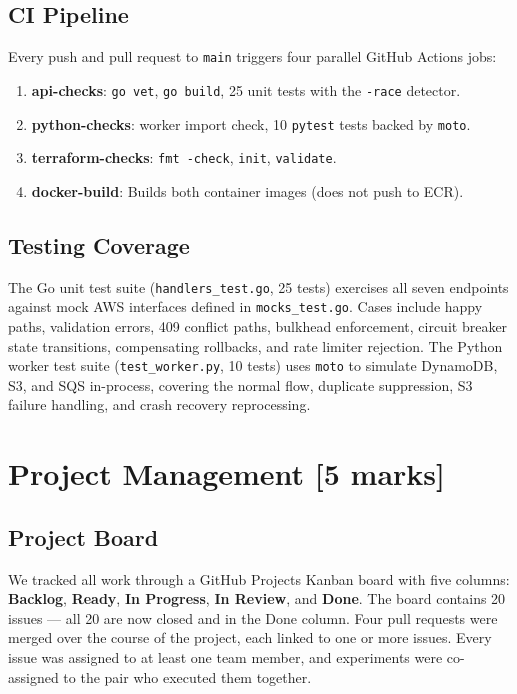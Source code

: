 \documentclass[11pt,letterpaper]{article}
\newcommand{\code}[1]{\texttt{\small #1}}
\begin{document}
\subsection{CI Pipeline}
Every push and pull request to \code{main} triggers four parallel GitHub Actions jobs:
\begin{enumerate}[noitemsep]
  \item \textbf{api-checks}: \code{go vet}, \code{go build}, 25 unit tests with the \code{-race} detector.
  \item \textbf{python-checks}: worker import check, 10 \code{pytest} tests backed by \code{moto}.
  \item \textbf{terraform-checks}: \code{fmt -check}, \code{init}, \code{validate}.
  \item \textbf{docker-build}: Builds both container images (does not push to ECR).
\end{enumerate}

\subsection{Testing Coverage}
The Go unit test suite (\code{handlers\_test.go}, 25 tests) exercises all seven endpoints against mock AWS interfaces defined in \code{mocks\_test.go}. Cases include happy paths, validation errors, 409 conflict paths, bulkhead enforcement, circuit breaker state transitions, compensating rollbacks, and rate limiter rejection. The Python worker test suite (\code{test\_worker.py}, 10 tests) uses \code{moto} to simulate DynamoDB, S3, and SQS in-process, covering the normal flow, duplicate suppression, S3 failure handling, and crash recovery reprocessing.


\section{Project Management [5 marks]}
\label{sec:pm}

\subsection{Project Board}
We tracked all work through a GitHub Projects Kanban board with five columns: \textbf{Backlog}, \textbf{Ready}, \textbf{In Progress}, \textbf{In Review}, and \textbf{Done}. The board contains 20 issues --- all 20 are now closed and in the Done column. Four pull requests were merged over the course of the project, each linked to one or more issues. Every issue was assigned to at least one team member, and experiments were co-assigned to the pair who executed them together.
\end{document}
